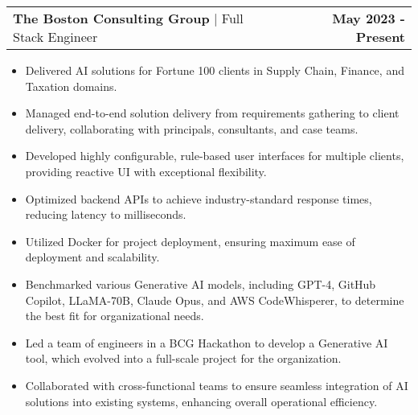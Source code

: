 \documentclass[a4paper,12pt]{article}
\makeatletter
\newenvironment{jobshort}[2]
    {
    \begin{tabularx}{\linewidth}{@{}l X r@{}}
    \textbf{#1} & \hfill &  #2 \\[3.75pt]
    \end{tabularx}
    }
    {
    }
\newenvironment{joblong}[3]
    {
    \begin{tabularx}{\linewidth}{@{}l X r@{}}
    \textbf{#1} | #2 & \hfill &  \textbf{#3} \\[3.75pt]
    \end{tabularx}
    \begin{minipage}[t]{\linewidth}
    \begin{itemize}[nosep,after=\strut, leftmargin=1em, itemsep=3pt,label=-]
    }
    {
    \end{itemize}
    \end{minipage}    
    }
\makeatother
\begin{document}


\begin{joblong}{The Boston Consulting Group}{Full Stack Engineer}{May 2023 - Present}
    
\item Delivered AI solutions for Fortune 100 clients in Supply Chain, Finance, and Taxation domains.
\item Managed end-to-end solution delivery from requirements gathering to client delivery, collaborating with principals, consultants, and case teams.
\item Developed highly configurable, rule-based user interfaces for multiple clients, providing reactive UI with exceptional flexibility.
\item Optimized backend APIs to achieve industry-standard response times, reducing latency to milliseconds.
\item Utilized Docker for project deployment, ensuring maximum ease of deployment and scalability.
\item Benchmarked various Generative AI models, including GPT-4, GitHub Copilot, LLaMA-70B, Claude Opus, and AWS CodeWhisperer, to determine the best fit for organizational needs.
\item Led a team of engineers in a BCG Hackathon to develop a Generative AI tool, which evolved into a full-scale project for the organization.
\item Collaborated with cross-functional teams to ensure seamless integration of AI solutions into existing systems, enhancing overall operational efficiency.

\end{joblong}
\end{document}
